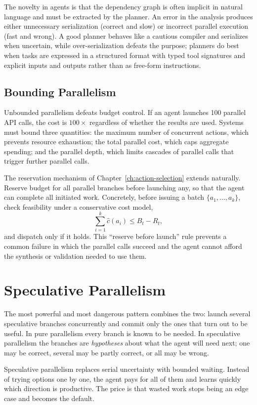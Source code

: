 \documentclass[11pt]{book}
\begin{document}
The novelty in agents is that the dependency graph is often implicit in natural language and must be extracted by the planner. An error in the analysis produces either unnecessary serialization (correct and slow) or incorrect parallel execution (fast and wrong). A good planner behaves like a cautious compiler and serializes when uncertain, while over-serialization defeats the purpose; planners do best when tasks are expressed in a structured format with typed tool signatures and explicit inputs and outputs rather than as free-form instructions.

\subsection{Bounding Parallelism}

Unbounded parallelism defeats budget control. If an agent launches 100 parallel API calls, the cost is $100\times$ regardless of whether the results are used. Systems must bound three quantities: the maximum number of concurrent actions, which prevents resource exhaustion; the total parallel cost, which caps aggregate spending; and the parallel depth, which limits cascades of parallel calls that trigger further parallel calls.

The reservation mechanism of Chapter~\ref{ch:action-selection} extends naturally. Reserve budget for all parallel branches before launching any, so that the agent can complete all initiated work. Concretely, before issuing a batch $\{a_1,\dots,a_k\}$, check feasibility under a conservative cost model,
\[
\sum_{i=1}^k \widehat{c}(a_i) \leq B_t - R_t,
\]
and dispatch only if it holds. This ``reserve before launch'' rule prevents a common failure in which the parallel calls succeed and the agent cannot afford the synthesis or validation needed to use them.

\section{Speculative Parallelism}

The most powerful and most dangerous pattern combines the two: launch several speculative branches concurrently and commit only the ones that turn out to be useful. In pure parallelism every branch is known to be needed. In speculative parallelism the branches are \textit{hypotheses} about what the agent will need next; one may be correct, several may be partly correct, or all may be wrong.

Speculative parallelism replaces serial uncertainty with bounded waiting. Instead of trying options one by one, the agent pays for all of them and learns quickly which direction is productive. The price is that wasted work stops being an edge case and becomes the default.
\end{document}
